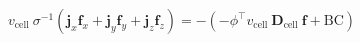 \begin{equation}
v_{\text{cell}} ~\sigma^{-1} \left(\mathbf{j}_x \mathbf{f}_x +\mathbf{j}_y \mathbf{f}_y  + \mathbf{j}_z \mathbf{f}_z \right) =
- \left(-\phi^{\top} v_{\text{cell}}~ \mathbf{D}_{\text{cell}} ~\mathbf{f}  + \text{BC} \right)
\end{equation}
